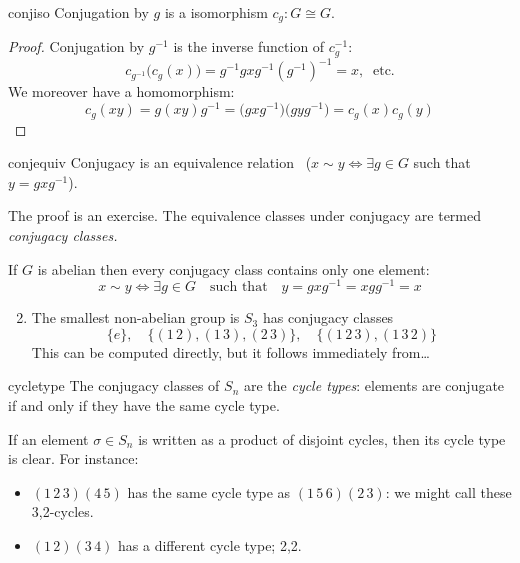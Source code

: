 \begin{lemm}{}{conjiso}
	Conjugation by $g$ is a isomorphism $c_g:G\cong G$.
\end{lemm}

\begin{proof}
	Conjugation by $g^{-1}$ is the inverse function of $c_g^{-1}$:
	\[
		c_{g^{-1}}\bigl(c_g(x)\bigr)=g^{-1}gx g^{-1}(g^{-1})^{-1}=x,\ \text{ etc.}
	\]
	We moreover have a homomorphism:
	\[
		c_g(xy)=g(xy)g^{-1}
		=\bigl(gx g^{-1}\bigr)\bigl(gy g^{-1}\bigr)
		=c_g(x)c_g(y)
		\tag*{\qedhere}
	\]
\end{proof}


\begin{lemm}{}{conjequiv}
	Conjugacy is an equivalence relation \ ($x\sim y\iff \exists g\in G$ such that $y=gx g^{-1}$).
\end{lemm}

The proof is an exercise. The equivalence classes under conjugacy are termed \emph{conjugacy classes.}


\begin{examples}{}{}
	\exstart If $G$ is abelian then every conjugacy class contains only one element:
	\[
		x\sim y\iff \exists g\in G
		\quad\text{such that}\quad 
		y=gx g^{-1}=xg g^{-1}=x
	\]
	\begin{enumerate}\setcounter{enumi}{1}
		\item The smallest non-abelian group is $S_3$ has conjugacy classes
		\[
			\{e\},\quad \{(1\,2),(1\,3),(2\,3)\},\quad \{(1\,2\,3),(1\,3\,2)\}
		\]
		This can be computed directly, but it follows immediately from\ldots
	\end{enumerate}
\end{examples}

\begin{thm}{}{cycletype}
	The conjugacy classes of $S_n$ are the \emph{cycle types}: elements are conjugate if and only if they have the same cycle type.
\end{thm}

If an element $\sigma\in S_n$ is written as a product of disjoint cycles, then its cycle type is clear. For instance:
\begin{itemize}
  \item $(1\,2\,3)(4\,5)$ has the same cycle type as $(1\,5\,6)(2\,3)$: we might call these 3,2-cycles.
  \item $(1\,2)(3\,4)$ has a different cycle type; 2,2.
\end{itemize}

\goodbreak

